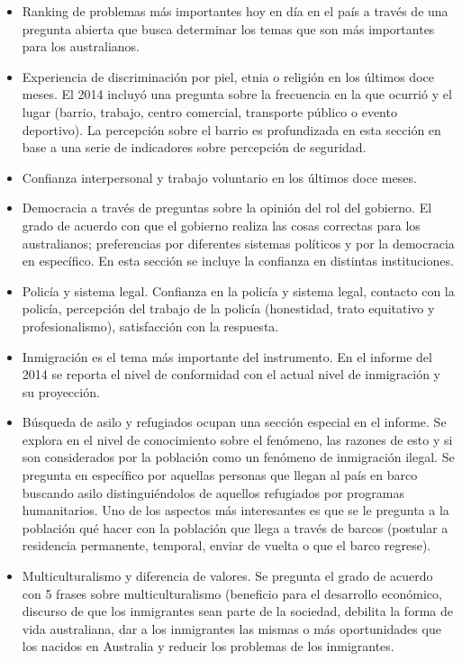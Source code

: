 \documentclass[
  12pt,
]{book}
\begin{document}
\begin{itemize}
\item
  Ranking de problemas más importantes hoy en día en el país a través
  de una pregunta abierta que busca determinar los temas que son más
  importantes para los australianos.
\item
  Experiencia de discriminación por piel, etnia o religión en los
  últimos doce meses. El 2014 incluyó una pregunta sobre la frecuencia
  en la que ocurrió y el lugar (barrio, trabajo, centro comercial,
  transporte público o evento deportivo). La percepción sobre el
  barrio es profundizada en esta sección en base a una serie de
  indicadores sobre percepción de seguridad.
\item
  Confianza interpersonal y trabajo voluntario en los últimos doce
  meses.
\item
  Democracia a través de preguntas sobre la opinión del rol del
  gobierno. El grado de acuerdo con que el gobierno realiza las cosas
  correctas para los australianos; preferencias por diferentes
  sistemas políticos y por la democracia en específico. En esta
  sección se incluye la confianza en distintas instituciones.
\item
  Policía y sistema legal. Confianza en la policía y sistema legal,
  contacto con la policía, percepción del trabajo de la policía
  (honestidad, trato equitativo y profesionalismo), satisfacción con
  la respuesta.
\item
  Inmigración es el tema más importante del instrumento. En el informe
  del 2014 se reporta el nivel de conformidad con el actual nivel de
  inmigración y su proyección.
\item
  Búsqueda de asilo y refugiados ocupan una sección especial en el
  informe. Se explora en el nivel de conocimiento sobre el fenómeno,
  las razones de esto y si son considerados por la población como un
  fenómeno de inmigración ilegal. Se pregunta en específico por
  aquellas personas que llegan al país en barco buscando asilo
  distinguiéndolos de aquellos refugiados por programas humanitarios.
  Uno de los aspectos más interesantes es que se le pregunta a la
  población qué hacer con la población que llega a través de barcos
  (postular a residencia permanente, temporal, enviar de vuelta o que
  el barco regrese).
\item
  Multiculturalismo y diferencia de valores. Se pregunta el grado de
  acuerdo con 5 frases sobre multiculturalismo (beneficio para el
  desarrollo económico, discurso de que los inmigrantes sean parte de
  la sociedad, debilita la forma de vida australiana, dar a los
  inmigrantes las mismas o más oportunidades que los nacidos en
  Australia y reducir los problemas de los inmigrantes.
\end{itemize}
\end{document}
